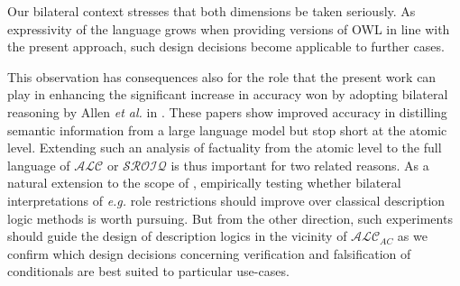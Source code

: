 \documentclass[letterpaper]{article} %
\theoremstyle{definition}
\theoremstyle{definition}
\theoremstyle{definition}
\theoremstyle{definition}
\theoremstyle{definition}
\begin{document}
Our bilateral context stresses that both dimensions be taken seriously. As expressivity of the language grows when providing versions of OWL in line with the present approach, such design decisions become applicable to further cases. 


This observation has consequences also for the role that the present work can play in enhancing the significant increase in accuracy won by adopting bilateral reasoning by Allen \emph{et al.} in \cite{DBLP:conf/nesy/AllenCFIG25,allenetal2026}. These papers show improved accuracy in distilling semantic information from a large language model but stop short at the atomic level. Extending such an analysis of factuality from the atomic level to the full language of $\mathcal{ALC}$ or $\mathcal{SROIQ}$ is thus important for two related reasons. As a natural extension to the scope of \cite{DBLP:conf/nesy/AllenCFIG25,allenetal2026}, empirically testing whether bilateral interpretations of \emph{e.g.} role restrictions should improve over classical description logic methods is worth pursuing. But from the other direction, such experiments should guide the design of description logics in the vicinity of $\mathcal{ALC}_{AC}$ as we confirm which design decisions concerning verification and falsification of conditionals are best suited to particular use-cases.


\end{document}
